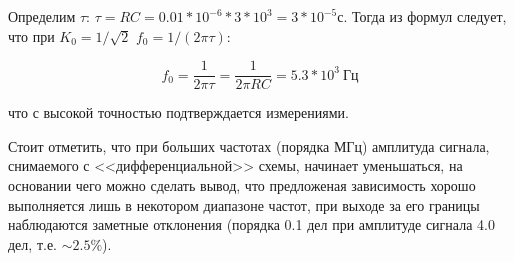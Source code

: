 \documentclass[14pt]{article}
\begin{document}
Определим $\tau$: $\tau = RC = 0.01*10^{-6}*3*10^{3} = 3*10^{-5}$с. Тогда из формул следует, что при $K_0 = 1/\sqrt{2}$ $f_0 = 1/(2\pi\tau)$:

$$f_0 = \frac{1}{2\pi\tau} = \frac{1}{2\pi RC} = 5.3*10^3~\text{Гц}$$

\noindent что с высокой точностью подтверждается измерениями.

Стоит отметить, что при больших частотах (порядка МГц) амплитуда сигнала, снимаемого с <<дифференциальной>> схемы, начинает уменьшаться, на основании чего можно сделать вывод, что предложеная зависимость хорошо выполняется лишь в некотором диапазоне частот, при выходе за его границы наблюдаются заметные отклонения (порядка 0.1 дел при амплитуде сигнала 4.0 дел, т.е. $\sim 2.5\%$).
\end{document}
